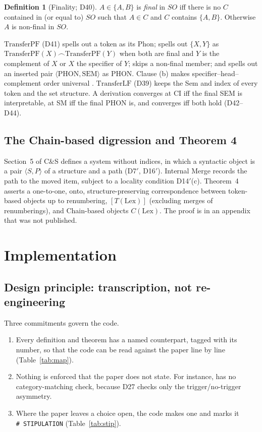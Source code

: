 \documentclass[11pt]{article}
\newcommand{\code}[1]{\texttt{\detokenize{#1}}}
\newcommand{\stipmark}{\texttt{\#~STIPULATION}}
\newcommand{\Def}[1]{D#1}
\newcommand{\TPF}{\mathrm{TransferPF}}
\newcommand{\TLF}{\mathrm{TransferLF}}
\newcommand{\pair}[1]{\langle #1 \rangle}
\theoremstyle{definition}
\newtheorem{definition}{Definition}
\theoremstyle{plain}
\begin{document}
\begin{definition}[Finality; \Def{40}]
$A \in \{A,B\}$ is \emph{final} in $SO$ iff there is no $C$ contained in (or
equal to) $SO$ such that $A\in C$ and $C$ contains $\{A,B\}$. Otherwise $A$ is
non-final in $SO$.
\end{definition}

\noindent
$\TPF$ (\Def{41}) spells out a token as its Phon; spells out $\{X,Y\}$ as
$\TPF(X)\frown\TPF(Y)$ when both are final and $Y$ is the complement of $X$
or $X$ the specifier of $Y$; skips a non-final member; and spells out an
inserted pair $\pair{\mathrm{PHON},\mathrm{SEM}}$ as PHON. Clause (b) makes
specifier--head--complement order universal \citep{Kayne1994}. $\TLF$
(\Def{39}) keeps the Sem and index of every token and the set structure. A
derivation converges at CI iff the final SEM is interpretable, at SM iff the
final PHON is, and converges iff both hold (\Def{42}--\Def{44}).

\subsection{The Chain-based digression and Theorem 4}

Section~5 of C\&S defines a system without indices, in which a syntactic
object is a pair $\pair{S,P}$ of a structure and a path (\Def{7}$'$,
\Def{16}$'$). Internal Merge records the path to the moved item, subject to a
locality condition \Def{14}$'$(c). Theorem~4 asserts a one-to-one, onto,
structure-preserving correspondence between token-based objects up to
renumbering, $[T(\mathrm{Lex})]$ (excluding merges of renumberings), and
Chain-based objects $C(\mathrm{Lex})$. The proof is in an appendix that was
not published.

\section{Implementation}
\label{sec:impl}

\subsection{Design principle: transcription, not re-engineering}

Three commitments govern the code.
\begin{enumerate}[leftmargin=*,itemsep=2pt]
\item Every definition and theorem has a named counterpart, tagged with its
  number, so that the code can be read against the paper line by line
  (Table~\ref{tab:map}).
\item Nothing is enforced that the paper does not state. For instance,
  \code{triggered_merge} has no category-matching check, because \Def{27}
  checks only the trigger/no-trigger asymmetry.
\item Where the paper leaves a choice open, the code makes one and marks it
  \stipmark{} (Table~\ref{tab:stip}).
\end{enumerate}
\end{document}

